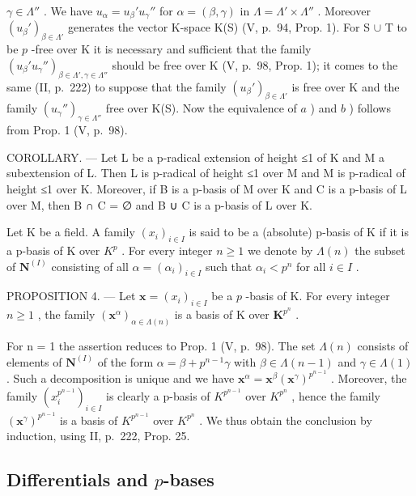 \(\gamma \in \Lambda''\) . We have \(u_{\alpha} = u_{\beta}' u_{\gamma}''\) for \(\alpha = (\beta, \gamma)\) in \(\Lambda = \Lambda' \times \Lambda''\) . Moreover \((u_{\beta}')_{\beta \in \Lambda'}\) generates the vector K-space K(S) (V, p.~94, Prop. 1). For S \(\cup\) T to be \(p\) -free over K it is necessary and sufficient that the family \((u_{\beta}' u_{\gamma}'')_{\beta \in \Lambda', \gamma \in \Lambda''}\) should be free over K (V, p.~98, Prop. 1); it comes to the same (II, p.~222) to suppose that the family \((u_{\beta}')_{\beta \in \Lambda'}\) is free over K and the family \((u_{\gamma}'')_{\gamma \in \Lambda''}\) free over K(S). Now the equivalence of \(a\) ) and \(b\) ) follows from Prop. 1 (V, p.~98).

COROLLARY. --- Let L be a p-radical extension of height ≤1 of K and M a subextension of L. Then L is p-radical of height ≤1 over M and M is p-radical of height ≤1 over K. Moreover, if B is a p-basis of M over K and C is a p-basis of L over M, then B ∩ C = ∅ and B ∪ C is a p-basis of L over K.

Let K be a field. A family \((x_{i})_{i\in I}\) is said to be a (absolute) p-basis of K if it is a p-basis of K over \(K^{p}\) . For every integer \(n\geqslant1\) we denote by \(\Lambda(n)\) the subset of \(\mathbf{N}^{(I)}\) consisting of all \(\alpha=(\alpha_{i})_{i\in I}\) such that \(\alpha_{i}<p^{n}\) for all \(i\in I\) .

PROPOSITION 4. --- Let \(\mathbf{x} = (x_i)_{i \in I}\) be a \(p\) -basis of K. For every integer \(n \geqslant 1\) , the family \((\mathbf{x}^\alpha)_{\alpha \in \Lambda(n)}\) is a basis of K over \(\mathbf{K}^{p^n}\) .

For n = 1 the assertion reduces to Prop. 1 (V, p.~98). The set \(\Lambda(n)\) consists of elements of \(\mathbf{N}^{(I)}\) of the form \(\alpha = \beta + p^{n-1}\gamma\) with \(\beta \in \Lambda(n-1)\) and \(\gamma \in \Lambda(1)\) . Such a decomposition is unique and we have \(\mathbf{x}^{\alpha} = \mathbf{x}^{\beta}(\mathbf{x}^{\gamma})^{p^{n-1}}\) . Moreover, the family \((x_{i}^{p^{n-1}})_{i \in I}\) is clearly a p-basis of \(K^{p^{n-1}}\) over \(K^{p^n}\) , hence the family \((\mathbf{x}^{\gamma})^{p^{n-1}}\) is a basis of \(K^{p^{n-1}}\) over \(K^{p^n}\) . We thus obtain the conclusion by induction, using II, p.~222, Prop. 25.

\subsection{\texorpdfstring{Differentials and \(p\)-bases}{Differentials and p-bases}}

